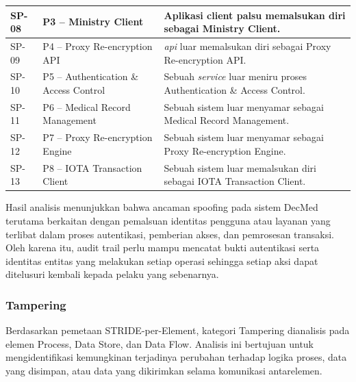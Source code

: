 \begin{xltabular}{\textwidth}{|>{\centering\arraybackslash}p{1.8cm}|>{\raggedright\arraybackslash}p{3.2cm}|X|}
    SP-08 &
    P3 -- Ministry Client &
    Aplikasi client palsu memalsukan diri sebagai Ministry Client. \\
    \hline

    SP-09 &
    P4 -- Proxy Re-encryption API &
    \textit{api} luar memalsukan diri sebagai Proxy Re-encryption API. \\
    \hline

    SP-10 &
    P5 -- Authentication \& Access Control &
    Sebuah \textit{service} luar meniru proses Authentication \& Access Control. \\
    \hline

    SP-11 &
    P6 -- Medical Record Management &
    Sebuah sistem luar menyamar sebagai Medical Record Management. \\
    \hline

    SP-12 &
    P7 -- Proxy Re-encryption Engine & Sebuah sistem luar menyamar sebagai Proxy Re-encryption Engine. \\ 
    \hline

    SP-13 & P8 -- IOTA Transaction Client & Sebuah sistem luar memalsukan diri sebagai IOTA Transaction Client. \\
    \hline

\end{xltabular}

Hasil analisis menunjukkan bahwa ancaman spoofing pada sistem DecMed terutama berkaitan dengan pemalsuan identitas pengguna atau layanan yang terlibat dalam proses autentikasi, pemberian akses, dan pemrosesan transaksi. Oleh karena itu, audit trail perlu mampu mencatat bukti autentikasi serta identitas entitas yang melakukan setiap operasi sehingga setiap aksi dapat ditelusuri kembali kepada pelaku yang sebenarnya.



\subsubsection{Tampering}

Berdasarkan pemetaan STRIDE-per-Element, kategori Tampering dianalisis pada elemen Process, Data Store, dan Data Flow. Analisis ini bertujuan untuk mengidentifikasi kemungkinan terjadinya perubahan terhadap logika proses, data yang disimpan, atau data yang dikirimkan selama komunikasi antarelemen.

